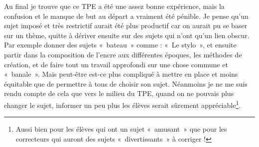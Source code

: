   Au final je trouve que ce TPE a été une assez bonne expérience, mais la confusion et le manque de but au départ a vraiment été pénible. Je pense qu'un sujet imposé et très restrictif aurait été plus productif car on aurait pu se baser sur un thème, quitte à dériver ensuite sur des sujets qui n'ont qu'un lien obscur. Par exemple donner des sujets «~bateau~» comme : «~Le stylo~», et ensuite partir dans la composition de l'encre aux différentes époques, les méthodes de création, et de faire tout un travail approfondi sur une chose commune et «~banale~». Mais peut-être est-ce plus compliqué à mettre en place et moins équitable que de permettre à tous de choisir son sujet. Néanmoins je ne me suis rendu compte de cela que vers le milieu du TPE, quand on ne pouvais plus changer le sujet, informer un peu plus les élèves serait sûrement appréciable\footnote{Aussi bien pour les élèves qui ont un sujet «~amusant~» que pour les correcteurs qui auront des sujets «~divertissants~» à corriger !}.
